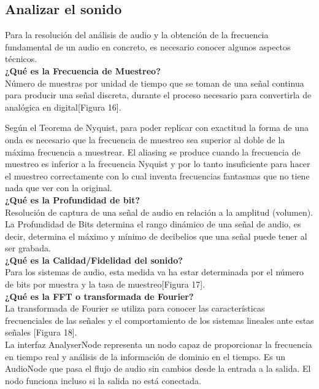 \subsection{Analizar el sonido}
\label{sec:analizar_sonido}
Para la resolución del análisis de audio y la obtención de la frecuencia fundamental de un audio en concreto, es necesario conocer algunos aspectos técnicos.\\

\noindent\textbf{¿Qué es la Frecuencia de Muestreo?}\\
Número de muestras por unidad de tiempo que se toman de una señal continua para producir una señal discreta, durante el proceso necesario para convertirla de analógica en digital[Figura 16].

Según el Teorema de Nyquist, para poder replicar con exactitud la forma  de una onda es necesario que la frecuencia de muestreo sea superior al doble de la máxima frecuencia  a  muestrear.
El aliasing se produce cuando la frecuencia de muestreo es inferior a la frecuencia Nyquist y por lo tanto insuficiente para hacer  el muestreo correctamente con lo cual inventa frecuencias fantasmas que no tiene nada que ver con la original.\\

\noindent\textbf{¿Qué es la Profundidad de bit?}\\
Resolución de captura de una señal de audio en relación a la amplitud (volumen). La Profundidad de Bits determina el rango dinámico de una señal de audio, es decir, determina el máximo y mínimo de decibelios que una señal puede tener al ser grabada.\\

\noindent\textbf{¿Qué es la Calidad/Fidelidad del sonido?}\\
Para los sistemas de audio, esta medida va ha estar determinada por el número de bits por muestra y la tasa de muestreo[Figura 17].\\

\noindent\textbf{¿Qué es la FFT o transformada de Fourier?}\\
La transformada de Fourier se utiliza para conocer las características frecuenciales de las señales y el comportamiento de los sistemas lineales ante estas señales [Figura 18].\\

La interfaz AnalyserNode representa un nodo capaz de proporcionar la frecuencia en tiempo real y análisis de la información de dominio en el tiempo. Es un AudioNode que pasa el flujo de audio sin cambios desde la entrada a la salida. El nodo funciona incluso si la salida no está conectada.

